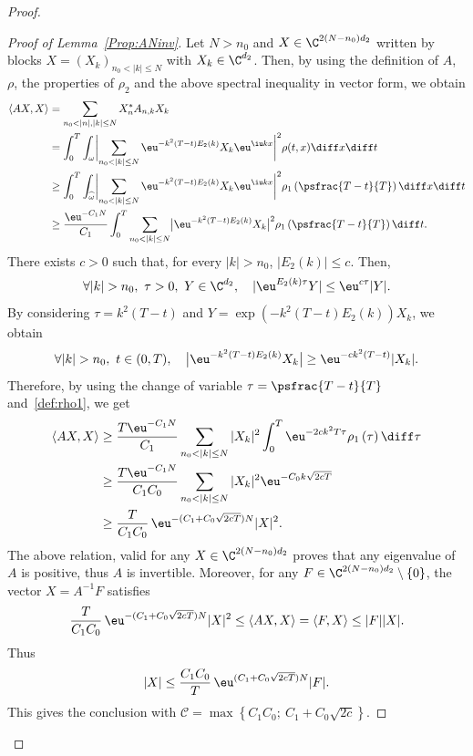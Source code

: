 \begin{proof}
\begin{proof}[Proof of Lemma~\ref{Prop:ANinv}]
Let $N>n_0$ and $X \in \C^{2(N-n_0)d_2}$ written by blocks $X=(X_k)_{n_0<|k|\leq N}$ with $X_k \in \C^{d_2}$. Then, by using the definition of $A$, $\rho$, the properties of $\rho_2$ and the above spectral inequality in vector form, we obtain
\begin{align*}
\langle AX,X\rangle
& = \sum_{n_0 < |n|,|k|\leq N} X_n^* A_{n,k} X_k \\
& = \int_0^T \int_{\omega} \biggl| \sum_{n_0 < |k|\leq N}
\eu^{-k^2(T-t)E_2(k)} X_k \eu^{\iu kx} \biggr|^2 \rho(t,x) \diff x \diff t
\\ & \geq
\int_0^T \int_{\widehat{\omega}} \biggl| \sum_{n_0 < |k|\leq N}
\eu^{-k^2(T-t)E_2(k)} X_k \eu^{\iu kx} \biggr|^2 \rho_1\left(\psfrac{T-t}{T} \right) \diff x \diff t
\\ & \geq \frac{\eu^{-C_1 N}}{C_1} \int_0^T \sum_{n_0 < |k|\leq N} \bigl| \eu^{-k^2(T-t)E_2(k)} X_k \bigr|^2 \rho_1 \left(\psfrac{T-t}{T} \right) \diff t.
\end{align*}
There exists $c>0$ such that, for every $|k|>n_0$, $|E_2(k)| \leq c$. Then,
\[
\forall |k| >n_0,\ \tau>0,\ Y\in\C^{d_2},\quad | \eu^{E_2(k)\tau}Y| \leq \eu^{c \tau} |Y|.
\]
By considering $\tau=k^2(T-t)$ and $Y=\exp \left(-k^2(T-t)E_2(k)\right) X_k$, we obtain
\[
\forall |k| >n_0,\ t \in (0,T), \quad
\big| \eu^{-k^2(T-t)E_2(k)} X_k \big| \geq \eu^{-ck^2(T-t)} |X_k|.
\]
Therefore, by using the change of variable $\tau=\psfrac{T-t}{T}$ and~\eqref{def:rho1}, we get
\begin{align*}
\langle AX,X\rangle
& \geq
\frac{T \eu^{-C_1 N}}{C_1} \sum_{n_0 < |k|\leq N} | X_k |^2 \int_0^T \eu^{-2ck^2T \tau} \rho_1 \left(\tau \right) \diff \tau
\\ & \geq
\frac{T \eu^{-C_1 N}}{C_1 C_0} \sum_{n_0 < |k|\leq N} | X_k |^2 \eu^{-C_0 k\sqrt{2cT}}
\\ & \geq
\frac{T}{C_1 C_0}\, \eu^{- (C_1+C_0 \sqrt{2cT})N} | X |^2.
\end{align*}
The above relation, valid for any $X\in\C^{2(N-n_0)d_2}$ proves that any eigenvalue of $A$ is positive, thus $A$ is invertible.
Moreover, for any $F \in \C^{2(N-n_0)d_2} \setminus \{0\}$, the vector $X=A^{-1}F$ satisfies
\[
\frac{T}{C_1 C_0}\, \eu^{- (C_1+C_0 \sqrt{2cT})N} | X |^2
\leq \langle AX, X \rangle = \langle F, X \rangle \leq |F| |X|.
\]
Thus
\[
|X| \leq \frac{C_1 C_0}{T}\, \eu^{ (C_1+C_0 \sqrt{2cT})N} |F|.
\]
This gives the conclusion with
$\mathcal{C}=\max\left\{ C_1 C_0 ;\ C_1+C_0 \sqrt{2c} \right\}$.
\end{proof}


\end{proof}
